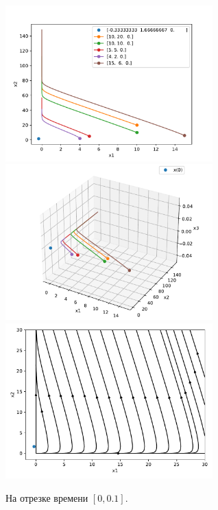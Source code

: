     \begin{figure}[H]
        \centering
        \includegraphics[width=8cm]{pictures/x3_0phase.pdf}
        \includegraphics[width=8cm]{pictures/x3_0phase3.pdf}
        \includegraphics[width=8cm]{pictures/x3_0vector.pdf}
        \caption{На отрезке времени \( [0, 0.1] \).}
    \end{figure}

